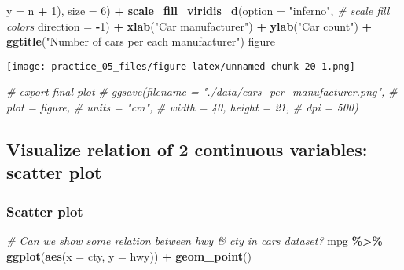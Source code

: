 \documentclass[
]{article}
\newenvironment{Shaded}{\begin{snugshade}}{\end{snugshade}}
\newcommand{\AttributeTok}[1]{\textcolor[rgb]{0.13,0.29,0.53}{#1}}
\newcommand{\CommentTok}[1]{\textcolor[rgb]{0.56,0.35,0.01}{\textit{#1}}}
\newcommand{\DecValTok}[1]{\textcolor[rgb]{0.00,0.00,0.81}{#1}}
\newcommand{\FunctionTok}[1]{\textcolor[rgb]{0.13,0.29,0.53}{\textbf{#1}}}
\newcommand{\NormalTok}[1]{#1}
\newcommand{\SpecialCharTok}[1]{\textcolor[rgb]{0.81,0.36,0.00}{\textbf{#1}}}
\newcommand{\StringTok}[1]{\textcolor[rgb]{0.31,0.60,0.02}{#1}}
\begin{document}
\begin{Shaded}
\begin{Highlighting}[]
                \AttributeTok{y =}\NormalTok{ n }\SpecialCharTok{+} \DecValTok{1}\NormalTok{),}
            \AttributeTok{size =} \DecValTok{6}\NormalTok{) }\SpecialCharTok{+}
  \FunctionTok{scale\_fill\_viridis\_d}\NormalTok{(}\AttributeTok{option =} \StringTok{"inferno"}\NormalTok{, }\CommentTok{\# scale fill colors}
                       \AttributeTok{direction =} \SpecialCharTok{{-}}\DecValTok{1}\NormalTok{) }\SpecialCharTok{+}
  \FunctionTok{xlab}\NormalTok{(}\StringTok{"Car manufacturer"}\NormalTok{) }\SpecialCharTok{+}
  \FunctionTok{ylab}\NormalTok{(}\StringTok{"Car count"}\NormalTok{) }\SpecialCharTok{+}
  \FunctionTok{ggtitle}\NormalTok{(}\StringTok{"Number of cars per each manufacturer"}\NormalTok{)}
\NormalTok{figure}
\end{Highlighting}
\end{Shaded}

\texttt{[image: practice\_05\_files/figure-latex/unnamed-chunk-20-1.png]}

\begin{Shaded}
\begin{Highlighting}[]
\CommentTok{\# export final plot}
\CommentTok{\# ggsave(filename = "./data/cars\_per\_manufacturer.png", }
\CommentTok{\#        plot = figure, }
\CommentTok{\#        units = "cm", }
\CommentTok{\#        width = 40, height = 21, }
\CommentTok{\#        dpi = 500)}
\end{Highlighting}
\end{Shaded}

\subsection{Visualize relation of 2 continuous variables: scatter
plot}\label{visualize-relation-of-2-continuous-variables-scatter-plot}

\subsubsection{Scatter plot}\label{scatter-plot}

\begin{Shaded}
\begin{Highlighting}[]
\CommentTok{\#   Can we show some relation between hwy \& cty in cars dataset?}
\NormalTok{mpg }\SpecialCharTok{\%\textgreater{}\%} 
  \FunctionTok{ggplot}\NormalTok{(}\FunctionTok{aes}\NormalTok{(}\AttributeTok{x =}\NormalTok{ cty,}
             \AttributeTok{y =}\NormalTok{ hwy)) }\SpecialCharTok{+}
  \FunctionTok{geom\_point}\NormalTok{()}
\end{Highlighting}
\end{Shaded}
\end{document}
